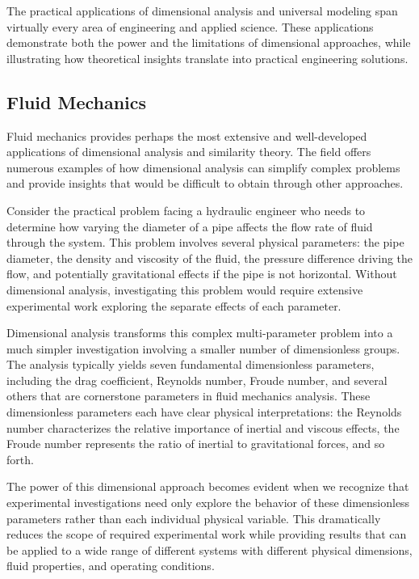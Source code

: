 \documentclass[
	11pt, %
	fleqn, %
	a4paper, %
]{LegrandOrangeBook}
\begin{document}
The practical applications of dimensional analysis and universal modeling span virtually every area of engineering and applied science. These applications demonstrate both the power and the limitations of dimensional approaches, while illustrating how theoretical insights translate into practical engineering solutions.

\subsection{Fluid Mechanics}

Fluid mechanics provides perhaps the most extensive and well-developed applications of dimensional analysis and similarity theory. The field offers numerous examples of how dimensional analysis can simplify complex problems and provide insights that would be difficult to obtain through other approaches.

Consider the practical problem facing a hydraulic engineer who needs to determine how varying the diameter of a pipe affects the flow rate of fluid through the system. This problem involves several physical parameters: the pipe diameter, the density and viscosity of the fluid, the pressure difference driving the flow, and potentially gravitational effects if the pipe is not horizontal. Without dimensional analysis, investigating this problem would require extensive experimental work exploring the separate effects of each parameter.

Dimensional analysis transforms this complex multi-parameter problem into a much simpler investigation involving a smaller number of dimensionless groups. The analysis typically yields seven fundamental dimensionless parameters, including the drag coefficient, Reynolds number, Froude number, and several others that are cornerstone parameters in fluid mechanics analysis. These dimensionless parameters each have clear physical interpretations: the Reynolds number characterizes the relative importance of inertial and viscous effects, the Froude number represents the ratio of inertial to gravitational forces, and so forth.

The power of this dimensional approach becomes evident when we recognize that experimental investigations need only explore the behavior of these dimensionless parameters rather than each individual physical variable. This dramatically reduces the scope of required experimental work while providing results that can be applied to a wide range of different systems with different physical dimensions, fluid properties, and operating conditions.
\end{document}
